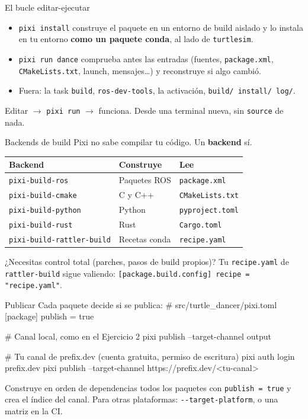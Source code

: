 \documentclass[aspectratio=169]{beamer}
\begin{document}
\begin{frame}{El bucle editar-ejecutar}
\begin{itemize}
    \item \lstinline|pixi install| construye el paquete en un entorno de build aislado y lo instala en tu entorno \textbf{como un paquete conda}, al lado de \texttt{turtlesim}.
    \item \lstinline|pixi run dance| comprueba antes las entradas (fuentes, \lstinline|package.xml|, \lstinline|CMakeLists.txt|, launch, mensajes\ldots) y reconstruye si algo cambió.
    \item Fuera: la task \texttt{build}, \lstinline|ros-dev-tools|, la activación, \lstinline|build/ install/ log/|.
\end{itemize}
\vfill
\begin{block}{}
\centering Editar $\rightarrow$ \lstinline|pixi run| $\rightarrow$ funciona. Desde una terminal nueva, sin \texttt{source} de nada.
\end{block}
\end{frame}

\begin{frame}{Backends de build}
Pixi no sabe compilar tu código. Un \textbf{backend} sí.
\vfill
\centering
\begin{tabular}{lll}
\toprule
\textbf{Backend} & \textbf{Construye} & \textbf{Lee} \\
\midrule
\texttt{pixi-build-ros} & Paquetes ROS & \lstinline|package.xml| \\
\texttt{pixi-build-cmake} & C y C++ & \lstinline|CMakeLists.txt| \\
\texttt{pixi-build-python} & Python & \lstinline|pyproject.toml| \\
\texttt{pixi-build-rust} & Rust & \lstinline|Cargo.toml| \\
\texttt{pixi-build-rattler-build} & Recetas conda & \lstinline|recipe.yaml| \\
\bottomrule
\end{tabular}
\vfill
\raggedright \small ¿Necesitas control total (parches, pasos de build propios)? Tu \lstinline|recipe.yaml| de \texttt{rattler-build} sigue valiendo: \lstinline|[package.build.config] recipe = "recipe.yaml"|.
\end{frame}

\begin{frame}[fragile]{Publicar}
Cada paquete decide si se publica:
# src/turtle_dancer/pixi.toml
[package]
publish = true
\begin{terminal}
# Canal local, como en el Ejercicio 2
pixi publish --target-channel output

# Tu canal de prefix.dev (cuenta gratuita, permiso de escritura)
pixi auth login prefix.dev
pixi publish --target-channel https://prefix.dev/<tu-canal>
\end{terminal}
\vfill
\small Construye en orden de dependencias todos los paquetes con \lstinline|publish = true| y crea el índice del canal. Para otras plataformas: \lstinline|--target-platform|, o una matriz en la CI.
\end{frame}
\end{document}
